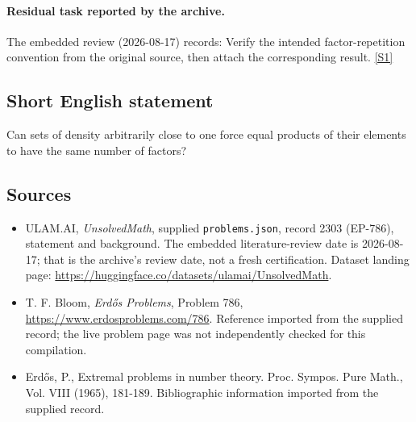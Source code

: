 \documentclass[11pt,a4paper]{article}
\newcommand{\sref}[2]{\hyperlink{source:#1:#2}{[S#2]}}
\begin{document}
\paragraph{Residual task reported by the archive.}

The embedded review (2026-08-17) records: Verify the intended factor-repetition convention from the original source, then attach the corresponding result. \sref{2303}{1}

\subsection{Short English statement}

Can sets of density arbitrarily close to one force equal products of their elements to have the same number of factors?

\subsection{Sources}

{\small

\begin{itemize}

\item[\hypertarget{source:2303:1}{S1}] ULAM.AI, \emph{UnsolvedMath}, supplied \texttt{problems.json}, record 2303 (EP-786), statement and background. The embedded literature-review date is 2026-08-17; that is the archive’s review date, not a fresh certification. Dataset landing page: \url{https://huggingface.co/datasets/ulamai/UnsolvedMath}.

\item[\hypertarget{source:2303:2}{S2}] T. F. Bloom, \emph{Erdős Problems}, Problem 786, \url{https://www.erdosproblems.com/786}. Reference imported from the supplied record; the live problem page was not independently checked for this compilation.

\item[\hypertarget{source:2303:3}{S3}] Erd\H{o}s, P., Extremal problems in number theory. Proc. Sympos. Pure Math., Vol. VIII (1965), 181-189. Bibliographic information imported from the supplied record.

\end{itemize}

}

\label{end:2303}
\end{document}
